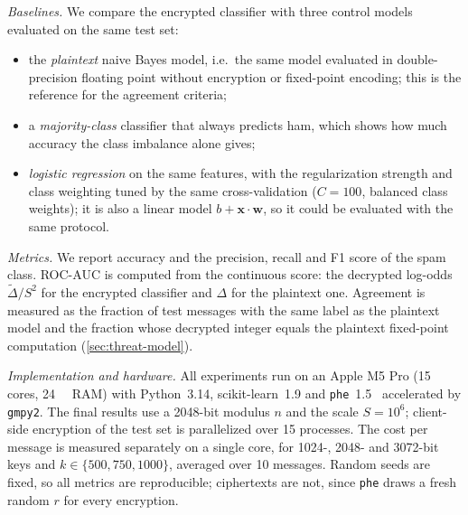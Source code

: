 \textit{Baselines.}
We compare the encrypted classifier with three control models evaluated on the same test set:
\begin{itemize}
  \item the \emph{plaintext} naive Bayes model, i.e.\ the same model evaluated in double-precision floating point without encryption or fixed-point encoding; this is the reference for the agreement criteria;
  \item a \emph{majority-class} classifier that always predicts ham, which shows how much accuracy the class imbalance alone gives;
  \item \emph{logistic regression} on the same features, with the regularization strength and class weighting tuned by the same cross-validation ($C = 100$, balanced class weights); it is also a linear model $b + \mathbf{x} \cdot \mathbf{w}$, so it could be evaluated with the same protocol.
\end{itemize}

\textit{Metrics.}
We report accuracy and the precision, recall and F1 score of the spam class.
ROC-AUC is computed from the continuous score: the decrypted log-odds $\tilde{\Delta} / S^2$ for the encrypted classifier and $\Delta$ for the plaintext one.
Agreement is measured as the fraction of test messages with the same label as the plaintext model and the fraction whose decrypted integer equals the plaintext fixed-point computation (\cref{sec:threat-model}).

\textit{Implementation and hardware.}
All experiments run on an Apple M5 Pro (15 cores, \SI{24}{\giga\byte} RAM) with Python~3.14, scikit-learn~1.9 and \texttt{phe}~1.5~\cite{phe} accelerated by \texttt{gmpy2}.
The final results use a \num{2048}-bit modulus $n$ and the scale $S = 10^6$; client-side encryption of the test set is parallelized over 15 processes.
The cost per message is measured separately on a single core, for \num{1024}-, \num{2048}- and \num{3072}-bit keys and $k \in \{500, 750, 1000\}$, averaged over 10 messages.
Random seeds are fixed, so all metrics are reproducible; ciphertexts are not, since \texttt{phe} draws a fresh random $r$ for every encryption.
